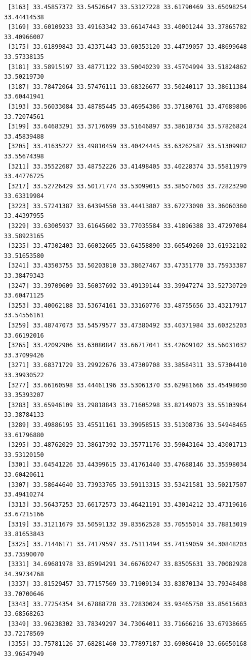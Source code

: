\documentclass[
  letterpaper,
  DIV=11,
  numbers=noendperiod]{scrartcl}
\begin{document}
\begin{verbatim}
 [3163] 33.45857372 33.54526647 33.53127228 33.61790469 33.65098254 33.44414538
 [3169] 33.60109233 33.49163342 33.66147443 33.40001244 33.37865782 33.40966007
 [3175] 33.61899843 33.43371443 33.60353120 33.44739057 33.48699648 33.57338135
 [3181] 33.58915197 33.48771122 33.50040239 33.45704994 33.51824862 33.50219730
 [3187] 33.78472064 33.57476111 33.68326677 33.50240117 33.38611384 33.60441941
 [3193] 33.56033084 33.48785445 33.46954386 33.37180761 33.47689806 33.72074561
 [3199] 33.64683291 33.37176699 33.51646897 33.38618734 33.57826824 33.45839488
 [3205] 33.41635227 33.49810459 33.40424445 33.63262587 33.51309982 33.55674398
 [3211] 33.35522687 33.48752226 33.41498405 33.40228374 33.55811979 33.44776725
 [3217] 33.52726429 33.50171774 33.53099015 33.38507603 33.72823290 33.63319984
 [3223] 33.57241387 33.64394550 33.44413807 33.67273090 33.36060360 33.44397955
 [3229] 33.63005937 33.61645602 33.77035584 33.41896388 33.47297084 33.58923165
 [3235] 33.47302403 33.66032665 33.64358890 33.66549260 33.61932102 33.51653580
 [3241] 33.43503755 33.50203810 33.38627467 33.47351770 33.75933387 33.38479343
 [3247] 33.39709609 33.56037692 33.49139144 33.39947274 33.52730729 33.60471125
 [3253] 33.40062188 33.53674161 33.33160776 33.48755656 33.43217917 33.54556161
 [3259] 33.48747073 33.54579577 33.47380492 33.40371984 33.60325203 33.66192016
 [3265] 33.42092906 33.63080847 33.66717041 33.42609102 33.56031032 33.37099426
 [3271] 33.68371729 33.29922676 33.47309708 33.38584311 33.57304410 33.39930522
 [3277] 33.66160598 33.44461196 33.53061370 33.62981666 33.45498030 33.35393207
 [3283] 33.65946109 33.29818843 33.71605298 33.82149073 33.55103964 33.38784133
 [3289] 33.49886195 33.45511161 33.39958515 33.51308736 33.54948465 33.61796880
 [3295] 33.48762029 33.38617392 33.35771176 33.59043164 33.43001713 33.53120150
 [3301] 33.64541226 33.44399615 33.41761440 33.47688146 33.35598034 33.60420611
 [3307] 33.58644640 33.73933765 33.59113315 33.53421581 33.50217507 33.49410274
 [3313] 33.56437253 33.66172573 33.46421191 33.43014212 33.47319616 33.67215166
 [3319] 33.31211679 33.50591132 39.83562528 33.70555014 33.78813019 33.81653843
 [3325] 33.71446171 33.74179597 33.75111494 33.74159059 34.30848203 33.73590070
 [3331] 34.69681978 33.85994291 34.66760247 33.83505631 33.70082928 34.39734768
 [3337] 33.81529457 33.77157569 33.71909134 33.83870134 33.79348408 33.70700646
 [3343] 33.77254354 34.67888728 33.72830024 33.93465750 33.85615603 33.68568263
 [3349] 33.96238302 33.78349297 34.73064011 33.71666216 33.67938665 33.72178569
 [3355] 33.75781126 37.68281460 33.77897187 33.69086410 33.66650168 33.96547949

\end{verbatim}
\end{document}
